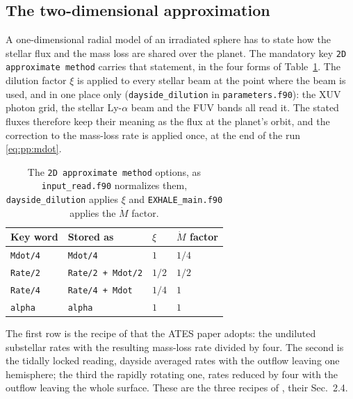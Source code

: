 \subsection{The two-dimensional approximation}
\label{sec:hydro:2d}

A one-dimensional radial model of an irradiated sphere has to state how the
stellar flux and the mass loss are shared over the planet.  The mandatory key
\texttt{2D approximate method} carries that statement, in the four forms of
Table~\ref{tab:2d}.  The dilution factor $\xi$ is applied to every stellar
beam at the point where the beam is used, and in one place only
(\texttt{dayside\_dilution} in \texttt{parameters.f90}): the XUV photon grid,
the stellar Ly-$\alpha$ beam and the FUV bands all read it.  The stated
fluxes therefore keep their meaning as the flux at the planet's orbit, and
the correction to the mass-loss rate is applied once, at the end of the run
\eqref{eq:pp:mdot}.

\begin{table}[htb]
\centering
\caption{The \texttt{2D approximate method} options, as
\texttt{input\_read.f90} normalizes them, \texttt{dayside\_dilution} applies
$\xi$ and \texttt{EXHALE\_main.f90} applies the $\dot M$ factor.}
\label{tab:2d}
\begin{tabular}{llll}
\toprule
Key word & Stored as & $\xi$ & $\dot M$ factor \\
\midrule
\texttt{Mdot/4} & \texttt{Mdot/4}          & $1$    & $1/4$ \\
\texttt{Rate/2} & \texttt{Rate/2 + Mdot/2} & $1/2$  & $1/2$ \\
\texttt{Rate/4} & \texttt{Rate/4 + Mdot}   & $1/4$  & $1$   \\
\texttt{alpha}  & \texttt{alpha}           & $1$    & $1$   \\
\bottomrule
\end{tabular}
\end{table}

The first row is the recipe of \citet{Salz2016} that the ATES paper adopts:
the undiluted substellar rates with the resulting mass-loss rate divided by
four.  The second is the tidally locked reading, dayside averaged rates with
the outflow leaving one hemisphere; the third the rapidly rotating one,
rates reduced by four with the outflow leaving the whole surface.  These are
the three recipes of \citet{Caldiroli2021}, their Sec.~2.4.

